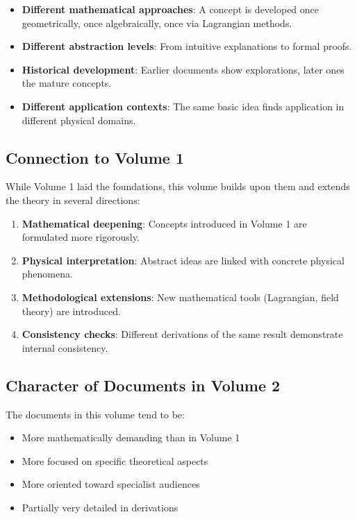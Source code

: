 \begin{itemize}
\item \textbf{Different mathematical approaches}: A concept is developed once geometrically, once algebraically, once via Lagrangian methods.

\item \textbf{Different abstraction levels}: From intuitive explanations to formal proofs.

\item \textbf{Historical development}: Earlier documents show explorations, later ones the mature concepts.

\item \textbf{Different application contexts}: The same basic idea finds application in different physical domains.
\end{itemize}

\subsection*{Connection to Volume 1}

While Volume 1 laid the foundations, this volume builds upon them and extends the theory in several directions:

\begin{enumerate}
\item \textbf{Mathematical deepening}: Concepts introduced in Volume 1 are formulated more rigorously.

\item \textbf{Physical interpretation}: Abstract ideas are linked with concrete physical phenomena.

\item \textbf{Methodological extensions}: New mathematical tools (Lagrangian, field theory) are introduced.

\item \textbf{Consistency checks}: Different derivations of the same result demonstrate internal consistency.
\end{enumerate}

\subsection*{Character of Documents in Volume 2}

The documents in this volume tend to be:

\begin{itemize}
\item More mathematically demanding than in Volume 1
\item More focused on specific theoretical aspects
\item More oriented toward specialist audiences
\item Partially very detailed in derivations
\end{itemize}

